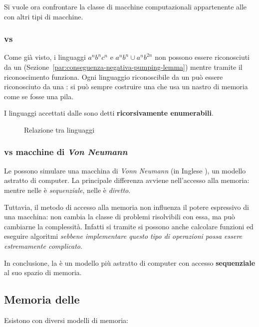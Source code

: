 \documentclass[italian, 10pt]{article}
\begin{document}
Si vuole ora confrontare la classe di macchine computazionali appartenente alle \TM con altri tipi di macchine.

\subsubsection{\TM vs \PDA}

Come già visto, i linguaggi \(a^n b^n c^n\) e \(a^n b^n \cup a^n b^{2n}\) non possono essere riconosciuti da un \PDA (Sezione~\ref{par:conseguenza-negativa-pumping-lemma}) mentre tramite \TM il riconoscimento funziona.
Ogni linguaggio riconoscibile da un \PDA può essere riconosciuto da una \TM: si può sempre costruire una \TM che usa un nastro di memoria come se fosse una pila.

I linguaggi accettati dalle \TM sono detti \textbf{ricorsivamente enumerabili}.

\begin{figure}[htbp]
  \bigskip
  \centering
  \caption{Relazione tra linguaggi}
  \label{fig:relazione-linguaggi}
  \bigskip
\end{figure}

\subsubsection{\TM vs macchine di \textit{Von Neumann}}

Le \TM possono simulare una macchina di \textit{Vonn Neumann} (in Inglese \VNM), un modello astratto di computer.
La principale differenza avviene nell'accesso alla memoria: mentre nelle \TM è \textit{sequenziale}, nelle \VNM è \textit{diretto}.

Tuttavia, il metodo di accesso alla memoria non influenza il potere espressivo di una macchina: non cambia la classe di problemi risolvibili con essa, ma può cambiarne la complessità.
Infatti si tramite \TM si possono anche calcolare funzioni ed eseguire algoritmi \textit{sebbene implementare questo tipo di operazioni possa essere estremamente complicato}.

\bigskip
In conclusione, la \TM è un modello più astratto di computer con accesso \textbf{sequenziale} al suo spazio di memoria.

\subsection{Memoria delle \TM}

Esistono \TM con diversi modelli di memoria:
\end{document}
